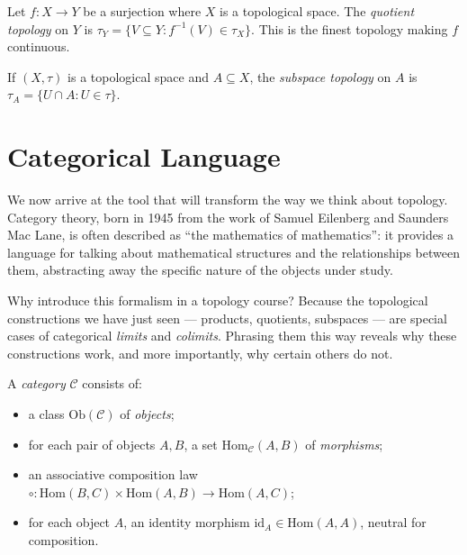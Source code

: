 \begin{definition}
Let $f\colon X \to Y$ be a surjection where $X$ is a topological space. The
\emph{quotient topology} on $Y$ is
$\tau_Y = \{V \subseteq Y : f^{-1}(V) \in \tau_X\}$.
This is the finest topology making $f$ continuous.
\end{definition}

\begin{definition}[Subspace]
If $(X,\tau)$ is a topological space and $A \subseteq X$, the \emph{subspace topology}
on $A$ is $\tau_A = \{U \cap A : U \in \tau\}$.
\end{definition}

\section{Categorical Language}

We now arrive at the tool that will transform the way we think about
topology. Category theory, born in 1945 from the work of Samuel Eilenberg
and Saunders Mac Lane, is often described as ``the mathematics of
mathematics'': it provides a language for talking about mathematical
structures and the relationships between them, abstracting away the specific
nature of the objects under study.

Why introduce this formalism in a topology course? Because the topological
constructions we have just seen --- products, quotients, subspaces --- are
special cases of categorical \emph{limits} and \emph{colimits}. Phrasing
them this way reveals why these constructions work, and more importantly,
why certain others do not.

\begin{definition}[Category]
A \emph{category} $\mathcal{C}$ consists of:
\begin{itemize}
  \item a class $\mathrm{Ob}(\mathcal{C})$ of \emph{objects};
  \item for each pair of objects $A,B$, a set $\mathrm{Hom}_{\mathcal{C}}(A,B)$ of
    \emph{morphisms};
  \item an associative composition law
    $\circ\colon \mathrm{Hom}(B,C) \times \mathrm{Hom}(A,B) \to \mathrm{Hom}(A,C)$;
  \item for each object $A$, an identity morphism $\mathrm{id}_A \in \mathrm{Hom}(A,A)$,
    neutral for composition.
\end{itemize}
\end{definition}

